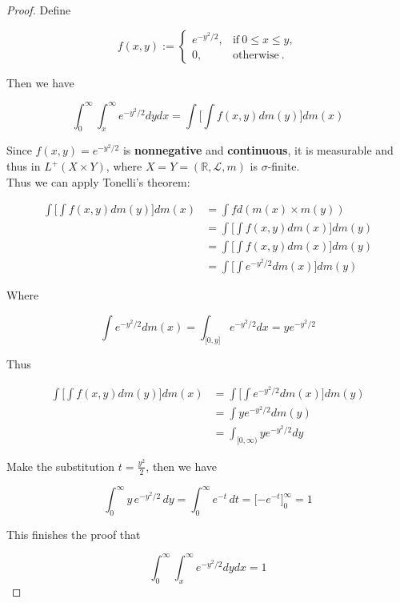 \begin{proof}

Define

\[f(x,y) := \left\{ \begin{matrix}
{e^{- y^{2}/2},} & {\text{if}\ 0 \leq x \leq y,} \\
{0,} & {\text{otherwise}\ .}
\end{matrix} \right.\]

Then we have

\[\int_{0}^{\infty}\int_{x}^{\infty}e^{- y^{2}/2} dy dx = \int\lbrack\int f(x,y) dm(y)\rbrack dm(x)\]

Since \(f(x,y) = e^{- y^{2}/2}\) is \textbf{nonnegative} and \textbf{continuous}, it is measurable and thus in \(L^{+}(X \times Y)\), where \(X = Y = (\mathbb{R},\mathcal{L},m)\) is \(\sigma\)-finite.\\
Thus we can apply Tonelli's theorem:

\[\begin{matrix}
{\int\lbrack\int f(x,y) dm(y)\rbrack dm(x)} & {= \int f d(m(x) \times m(y))} \\
 & {= \int\lbrack\int f(x,y) dm(x)\rbrack dm(y)} \\
 & {= \int\lbrack\int f(x,y) dm(x)\rbrack dm(y)} \\
 & {= \int\lbrack\int e^{- y^{2}/2} dm(x)\rbrack dm(y)}
\end{matrix}\]

Where

\[\int e^{- y^{2}/2} dm(x) = \int_{\lbrack 0,y\rbrack}e^{- y^{2}/2} dx = ye^{- y^{2}/2}\]

Thus

\[\begin{matrix}
{\int\lbrack\int f(x,y) dm(y)\rbrack dm(x)} & {= \int\lbrack\int e^{- y^{2}/2} dm(x)\rbrack dm(y)} \\
 & {= \int ye^{- y^{2}/2} dm(y)} \\
 & {= \int_{\lbrack 0,\infty)}ye^{- y^{2}/2} dy}
\end{matrix}\]

Make the substitution \(t = \frac{y^{2}}{2}\), then we have

\[\int_{0}^{\infty}y\, e^{- y^{2}/2}\, dy = \int_{0}^{\infty}e^{- t}\, dt = \lbrack - e^{- t}\rbrack_{0}^{\infty} = 1\]

This finishes the proof that

\[\int_{0}^{\infty}\int_{x}^{\infty}e^{- y^{2}/2} dy dx = 1\]

\end{proof}

